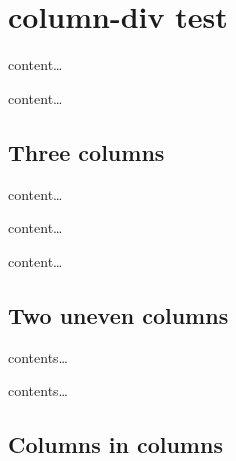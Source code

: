 \hypertarget{column-div-test}{%
\section{column-div test}\label{column-div-test}}

content\ldots{}

\leavevmode\hypertarget{thisdivdoesnothing}{}%
content\ldots{}

\hypertarget{three-columns}{%
\subsection{Three columns}\label{three-columns}}

\begin{multicols}{3}

content\ldots{}

content\ldots{}

content\ldots{}

\end{multicols}

\hypertarget{two-uneven-columns}{%
\subsection{Two uneven columns}\label{two-uneven-columns}}

\begin{minipage}[b]{0.4\columnwidth}

contents\ldots{}

\end{minipage}\begin{minipage}[b]{0.6\columnwidth}

contents\ldots{}

\end{minipage}

\hypertarget{columns-in-columns}{%
\subsection{Columns in columns}\label{columns-in-columns}}

